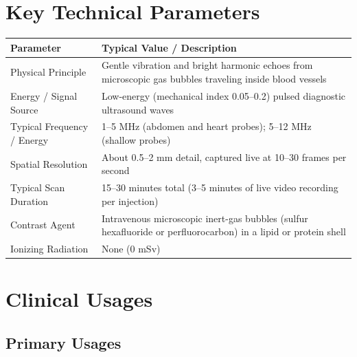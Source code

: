 \section{Key Technical Parameters}

\noindent
\begin{tabularx}{\textwidth}{@{}l X@{}}
\toprule
\textbf{Parameter} & \textbf{Typical Value / Description} \\
\midrule
Physical Principle & Gentle vibration and bright harmonic echoes from microscopic gas bubbles traveling inside blood vessels \\
Energy / Signal Source & Low-energy (mechanical index 0.05--0.2) pulsed diagnostic ultrasound waves \\
Typical Frequency / Energy & 1--5 MHz (abdomen and heart probes); 5--12 MHz (shallow probes) \\
Spatial Resolution & About 0.5--2 mm detail, captured live at 10--30 frames per second \\
Typical Scan Duration & 15--30 minutes total (3--5 minutes of live video recording per injection) \\
Contrast Agent & Intravenous microscopic inert-gas bubbles (sulfur hexafluoride or perfluorocarbon) in a lipid or protein shell \\
Ionizing Radiation & None (0 mSv) \\
\bottomrule
\end{tabularx}

\section{Clinical Usages}

\subsection{Primary Usages}

